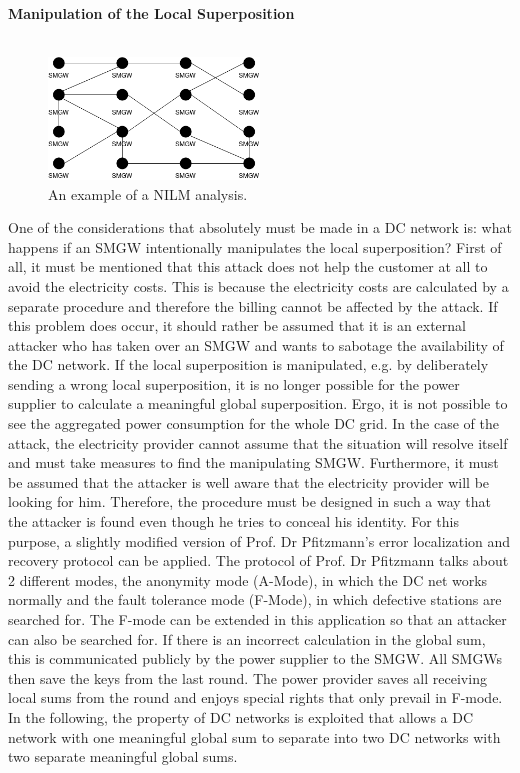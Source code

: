 \\ 
\textbf{Manipulation of the Local Superposition}
\\
\\
\begin{figure}[tbp]
  \centering
  \includegraphics[width=0.5\textwidth]{images/DC Net before Split.png}
  \caption[Short description]{An example of a NILM analysis.}
  \label{fig:Appliance_Model}
\end{figure}
One of the considerations that absolutely must be made in a DC network is: what happens if an SMGW intentionally manipulates the local superposition?
First of all, it must be mentioned that this attack does not help the customer at all to avoid the electricity costs. This is because the electricity costs are calculated by a separate procedure and therefore the billing cannot be affected by the attack. If this problem does occur, it should rather be assumed that it is an external attacker who has taken over an SMGW and wants to sabotage the availability of the DC network.
If the local superposition is manipulated, e.g. by deliberately sending a wrong local superposition, it is no longer possible for the power supplier to calculate a meaningful global superposition. Ergo, it is not possible to see the aggregated power consumption for the whole DC grid. In the case of the attack, the electricity provider cannot assume that the situation will resolve itself and must take measures to find the manipulating SMGW. Furthermore, it must be assumed that the attacker is well aware that the electricity provider will be looking for him. Therefore, the procedure must be designed in such a way that the attacker is found even though he tries to conceal his identity.
For this purpose, a slightly modified version of Prof. Dr Pfitzmann's error localization and recovery protocol can be applied. The protocol of Prof. Dr Pfitzmann talks about 2 different modes, the anonymity mode (A-Mode), in which the DC net works normally and the fault tolerance mode (F-Mode), in which defective stations are searched for.
The F-mode can be extended in this application so that an attacker can also be searched for. If there is an incorrect calculation in the global sum, this is communicated publicly by the power supplier to the SMGW. All SMGWs then save the keys from the last round. The power provider saves all receiving local sums from the round and enjoys special rights that only prevail in F-mode. In the following, the property of DC networks is exploited that allows a DC network with one meaningful global sum to separate into two DC networks with two separate meaningful global sums.
